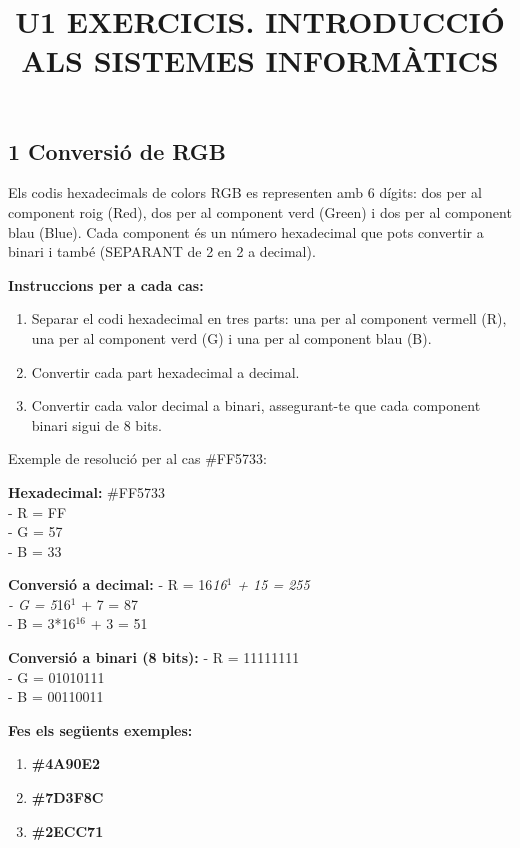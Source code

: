 \documentclass[
  12 pt,
  a4paper,
]{article}
\title{U1 EXERCICIS. INTRODUCCIÓ ALS SISTEMES INFORMÀTICS}
\author{}
\date{\vspace{-2.5em}}
\providecommand{\tightlist}{%
  \setlength{\itemsep}{0pt}\setlength{\parskip}{0pt}}
\begin{document}
\maketitle

{
\setcounter{tocdepth}{2}
\tableofcontents
}
\newpage
\renewcommand\tablename{Tabla}

\subsection{1 Conversió de RGB}\label{conversiuxf3-de-rgb}

Els codis hexadecimals de colors RGB es representen amb 6 dígits: dos
per al component roig (Red), dos per al component verd (Green) i dos per
al component blau (Blue). Cada component és un número hexadecimal que
pots convertir a binari i també (SEPARANT de 2 en 2 a decimal).

\textbf{Instruccions per a cada cas:}

\begin{enumerate}
\def\labelenumi{\arabic{enumi}.}
\tightlist
\item
  Separar el codi hexadecimal en tres parts: una per al component
  vermell (R), una per al component verd (G) i una per al component blau
  (B).
\item
  Convertir cada part hexadecimal a decimal.
\item
  Convertir cada valor decimal a binari, assegurant-te que cada
  component binari sigui de 8 bits.
\end{enumerate}

Exemple de resolució per al cas \#FF5733:

\textbf{Hexadecimal:} \#FF5733\\
- R = FF\\
- G = 57\\
- B = 33

\textbf{Conversió a decimal:} - R = 16\emph{16\(^{1}\) + 15 = 255\\
- G = 5}16\(^{1}\) + 7 = 87\\
- B = 3*16\(^{16}\) + 3 = 51

\textbf{Conversió a binari (8 bits):} - R = 11111111\\
- G = 01010111\\
- B = 00110011

\textbf{Fes els següents exemples:}

\begin{enumerate}
\def\labelenumi{\arabic{enumi}.}
\tightlist
\item
  \textbf{\#4A90E2}\\
\item
  \textbf{\#7D3F8C}\\
\item
  \textbf{\#2ECC71}
\end{enumerate}
\end{document}
